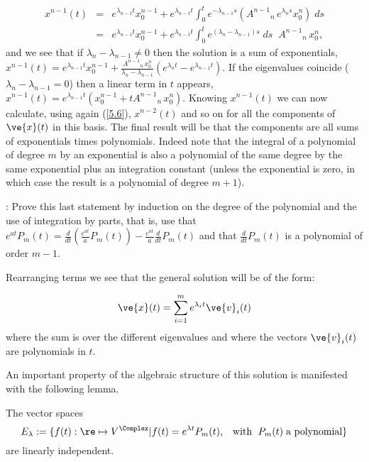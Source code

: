 \begin{eqnarray}
  x^{n-1}(t) &=& e^{\lambda_{n-1}t} x^{n-1}_0  
               + e^{\lambda_{n-1}t} 
               \int_0^t e^{-\lambda_{n-1}s}(A^{n-1}{}_n \,e^{\lambda_n s} x^n_0 )\; ds \\
               &=& e^{\lambda_{n-1}t} x^{n-1}_0  
               + e^{\lambda_{n-1}t} 
               \int_0^t e^{(\lambda_n -\lambda_{n-1})s}\; ds \;\;A^{n-1}{}_n \, x^n_0,
\end{eqnarray}
and we see that if $\lambda_n -\lambda_{n-1} \neq 0$ then the solution
is a sum of exponentials, 
$x^{n-1}(t) = e^{\lambda_{n-1}t} x^{n-1}_0 + \frac{A^{n-1}{}_n \, x^n_0}{\lambda_n -\lambda_{n-1}}(e^{\lambda_{n}t}-e^{\lambda_{n-1}t})$.
If the eigenvalues coincide ($\lambda_n -\lambda_{n-1} = 0$)
then a linear term in $t$ appears, 
$x^{n-1}(t) = e^{\lambda_{n-1}t}(x^{n-1}_0 + t A^{n-1}{}_n \, x^n_0)$.
Knowing $x^{n-1}(t)$ we can now calculate, using again (\ref{5.6}),
$x^{n-2}(t)$ and so on for all the components of $\ve{x}(t)$ in
this basis. 
The final result will be that the components are all sums
of exponentials times polynomials. Indeed note that the integral of
a polynomial of degree $m$ by an exponential is also 
a polynomial of the same degree by the same exponential plus an integration constant
(unless the exponential is zero, in which
case the result is a polynomial of degree $m+1$).
\espa

\ejer: Prove this last statement by induction on the degree
of the polynomial and the use of integration by parts, that is, use
that 
$e^{at}P_m(t) = \frac{d}{dt}(\frac{e^{at}}{a}P_m(t)) - \frac{e^{at}}{a}\frac{d}{dt}{P_m(t)}$
and that  $\frac{d}{dt}{P_m(t)}$ is a polynomial of order $m-1$.

\espa

\noi Rearranging terms we see that the general solution will be 
of the form:

\begin{equation}
  \label{eq:5_sol_gen}
  \ve{x}(t) = \sum_{i=1}^{m} e^{\lambda_i t} \ve{v}_i(t)
\end{equation}
%
where the sum is over the different eigenvalues and where the 
vectors $\ve{v}_i(t)$ are polynomials in $t$.

An important property of the algebraic structure of this solution
is manifested with the following lemma.

\blem
The vector spaces 
\[
E_{\lambda} := \{f(t): \re \mapsto V^{\Complex} | f(t) = e^{\lambda t}P_m(t), 
\;\;\;\mbox{with }\; P_m(t)\;\mbox{a polynomial}\}
\] 
are linearly independent.
\elem

